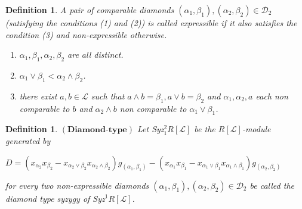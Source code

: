 \documentclass[10pt,reqno]{amsart}
\numberwithin{equation}{section}
\newtheorem{definition}[theorem]{Definition}
\begin{document}
\begin{definition}\label{expressible} A pair of comparable diamonds $(\alpha_1,\beta_1), (\alpha_2,\beta_2) \in \mathcal{D}_2$ (satisfying the conditions (1) and (2)) is called \textit{expressible} if it also satisfies the condition (3) and \textit{non-expressible} otherwise.
\begin{enumerate}
  \item $\alpha_1, \beta_1, \alpha_2, \beta_2$ are all distinct.
  \item $\alpha_1 \vee \beta_1 < \alpha_2 \wedge \beta_2$.
  \item there exist $a,b \in \mathcal{L}$ such that $a\wedge b=\beta_1, a\vee b= \beta_2$ and $\alpha_1, \alpha_2, a$ each non comparable to $b$ and $\alpha_2 \wedge b$ non comparable to $\alpha_1 \vee \beta_1$.
 \end{enumerate}
 \end{definition}
 \begin{definition}\label{Diamond}
 $(\textbf{Diamond-type})$ Let Syz$_{1}^2 R[\mathcal{L}]$ be the $R[\mathcal{L}]$-module generated by  
 \begin{center}
 $D=(x_{\alpha_2}x_{\beta_2}-x_{\alpha_2 \vee \beta_2}x_{\alpha_2 \wedge \beta_2})g_{(\alpha_1,\beta_1)}-
(x_{\alpha_1}x_{\beta_1}- x_{\alpha_1 \vee \beta_1}x_{\alpha_1 \wedge \beta_1})g_{(\alpha_2,\beta_2)}$
\end{center}
for every two non-expressible diamonds $(\alpha_1,\beta_1),(\alpha_2,\beta_2)\in \mathcal{D}_2$ be called the diamond type syzygy of Syz$^{1}R[\mathcal{L}]$.
 \end{definition}
\end{document}
